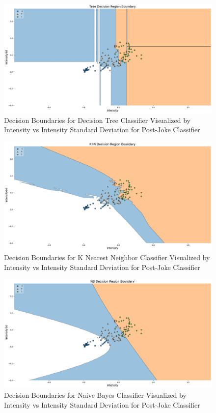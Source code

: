 \documentclass[onecolumn, draftclsnofoot,10pt, compsoc]{IEEEtran}
\begin{document}
\begin{figure}[!h]
\includegraphics[width=\linewidth]{assets/fig12.eps}
\caption{Decision Boundaries for Decision Tree Classifier Visualized by Intensity vs Intensity Standard Deviation for Post-Joke Classifier}
\end{figure}

\begin{figure}[!h]
\includegraphics[width=\linewidth]{assets/fig13.eps}
\caption{Decision Boundaries for K Nearest Neighbor Classifier Visualized by Intensity vs Intensity Standard Deviation for Post-Joke Classifier}
\end{figure}

\begin{figure}[!h]
\includegraphics[width=\linewidth]{assets/fig14.eps}
\caption{Decision Boundaries for Naive Bayes Classifier Visualized by Intensity vs Intensity Standard Deviation for Post-Joke Classifier}
\end{figure}
\end{document}
